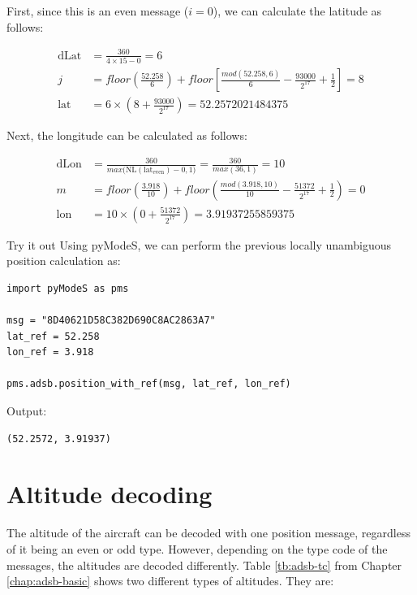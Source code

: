 First, since this is an even message ($i=0$), we can calculate the latitude as follows:

\begin{align}
  \mathrm{dLat} &= \frac{360}{4 \times 15 - 0} = 6 \\
  j &= floor \left( \frac{52.258}{6} \right) + floor \left[ \frac{mod(52.258, 6)}{6} - \frac{93000}{2^{17}}  + \frac{1}{2} \right] = 8 \\
  \mathrm{lat} &= 6 \times \left( 8 + \frac{93000}{2^{17}} \right) = 52.2572021484375
\end{align}

Next, the longitude can be calculated as follows:

\begin{align}
  \mathrm{dLon} &= \frac{360}{max \Big( \mathrm{NL}(\mathrm{lat}_\mathrm{even})-0, 1 \Big)} = \frac{360}{max(36, 1)} = 10 \\
  m &= floor \left( \frac{3.918}{10} \right) + floor \left( \frac{mod(3.918, 10)}{10} - \frac{51372}{2^{17}}  + \frac{1}{2}  \right) = 0 \\
  \mathrm{lon} &= 10 \times \left(0 + \frac{51372}{2^{17}} \right) = 3.91937255859375
\end{align}

%

\begin{notebox}{Try it out}
Using pyModeS, we can perform the previous locally unambiguous position calculation as: 

\begin{verbatim}
import pyModeS as pms

msg = "8D40621D58C382D690C8AC2863A7"
lat_ref = 52.258
lon_ref = 3.918

pms.adsb.position_with_ref(msg, lat_ref, lon_ref)
\end{verbatim}

Output: 

\begin{verbatim}
(52.2572, 3.91937)
\end{verbatim}

\end{notebox}


\section{Altitude decoding}

The altitude of the aircraft can be decoded with one position message, regardless of it being an even or odd type. However, depending on the type code of the messages, the altitudes are decoded differently. Table \ref{tb:adsb-tc} from Chapter \ref{chap:adsb-basic} shows two different types of altitudes. They are:

